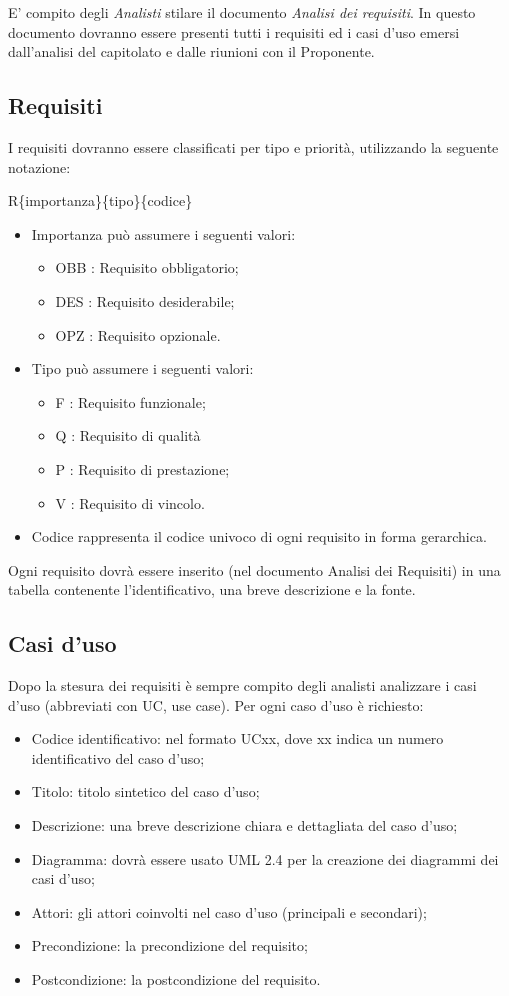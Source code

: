 E' compito degli \textit{Analisti} stilare il documento \textit{Analisi dei requisiti}.
In questo documento dovranno essere presenti tutti i requisiti ed i casi d'uso emersi dall'analisi del capitolato e dalle riunioni con il Proponente.\\

\subsection{Requisiti}

I requisiti dovranno essere classificati per tipo e priorità, utilizzando la seguente notazione:

R\{importanza\}\{tipo\}\{codice\}
\begin{itemize}
  \item Importanza può assumere i seguenti valori:
\begin{itemize}
	\item {OBB} : Requisito obbligatorio;
	\item {DES} : Requisito desiderabile;
	\item {OPZ} : Requisito opzionale.
\end{itemize}
  \item Tipo può assumere i seguenti valori:
\begin{itemize}
	\item {F} : Requisito funzionale;
	\item {Q} : Requisito di qualità
	\item {P} : Requisito di prestazione;
	\item {V} : Requisito di vincolo.
\end{itemize}
  \item Codice rappresenta il codice univoco di ogni requisito in forma gerarchica.
\end{itemize}
Ogni requisito dovrà essere inserito (nel documento Analisi dei Requisiti) in una tabella contenente l'identificativo, una breve descrizione e la fonte.

\subsection{Casi d'uso}

Dopo la stesura dei requisiti è sempre compito degli analisti analizzare i casi d'uso (abbreviati con UC, use case).
Per ogni caso d'uso è richiesto:
\begin{itemize}
	\item Codice identificativo: nel formato UCxx, dove xx indica un numero identificativo del caso d'uso;
	\item Titolo: titolo sintetico del caso d'uso;
	\item Descrizione: una breve descrizione chiara e dettagliata del caso d'uso;
	\item Diagramma: dovrà essere usato UML 2.4 per la creazione dei diagrammi dei casi d'uso;
	\item Attori: gli attori coinvolti nel caso d'uso (principali e secondari);
	\item Precondizione: la precondizione del requisito;
	\item Postcondizione: la postcondizione del requisito.
\end{itemize}

